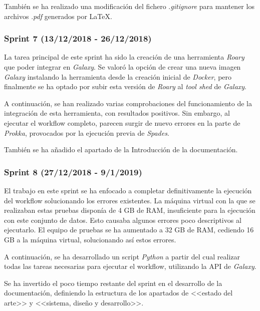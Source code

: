 También se ha realizado una modificación del fichero .\textit{gitignore} para mantener los archivos .\textit{pdf} generados por \LaTeX.

\subsubsection{Sprint 7 (13/12/2018 - 26/12/2018)}
La tarea principal de este sprint ha sido la creación de una herramienta \textit{Roary} que poder integrar en \textit{Galaxy}. Se valoró la opción de crear una nueva imagen \textit{Galaxy} instalando la herramienta desde la creación inicial de \textit{Docker}, pero finalmente se ha optado por subir esta versión de \textit{Roary} al \emph{tool shed} de \textit{Galaxy}.

A continuación, se han realizado varias comprobaciones del funcionamiento de la integración de esta herramienta, con resultados positivos. Sin embargo, al ejecutar el workflow completo, parecen surgir de nuevo errores en la parte de \textit{Prokka}, provocados por la ejecución previa de \textit{Spades}. 

También se ha añadido el apartado de la Introducción de la documentación.

\subsubsection{Sprint 8 (27/12/2018 - 9/1/2019)}
El trabajo en este sprint se ha enfocado a completar definitivamente la ejecución del workflow solucionando los errores existentes. La máquina virtual con la que se realizaban estas pruebas disponía de 4 GB de RAM, insuficiente para la ejecución con este conjunto de datos. Esto causaba algunos errores poco descriptivos al ejecutarlo. El equipo de pruebas se ha aumentado a 32 GB de RAM, cediendo 16 GB a la máquina virtual, solucionando así estos errores.

A continuación, se ha desarrollado un script \textit{Python} a partir del cual realizar todas las tareas necesarias para ejecutar el workflow, utilizando la API de \textit{Galaxy}.

Se ha invertido el poco tiempo restante del sprint en el desarrollo de la documentación, definiendo la estructura de los apartados de <<estado del arte>> y <<sistema, diseño y desarrollo>>.
\newpage \thispagestyle{empty} %